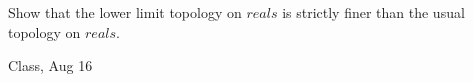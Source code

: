 \begin{samepage}
\begin{ex}
Show that the lower limit topology on $reals$ is strictly finer than the usual topology on $reals$.
\end{ex}
\begin{source}
Class, Aug 16
\end{source}
\end{samepage}

